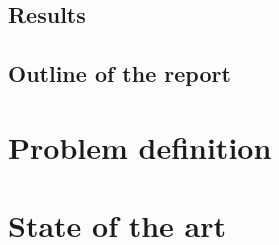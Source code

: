\documentclass[11pt,twoside,a4paper]{report}
\begin{document}
\section{Results}

\section{Outline of the report}

\chapter{Problem definition}

\chapter{State of the art}
\end{document}
